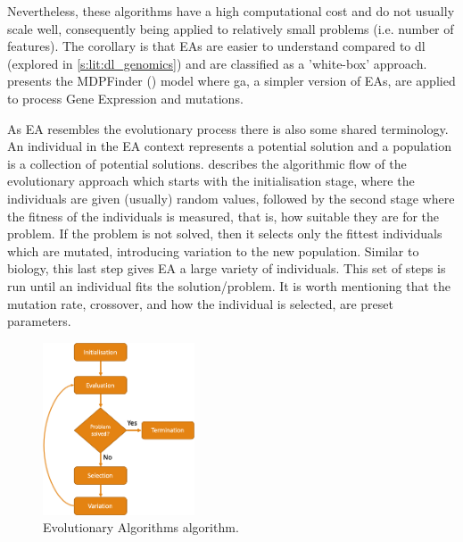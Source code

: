 Nevertheless, these algorithms have a high computational cost and do not usually scale well, consequently being applied to relatively small problems (i.e. number of features). The corollary is that EAs are easier to understand compared to  \acrfull{dl} (explored in \cref{s:lit:dl_genomics}) and are classified as a 'white-box' approach.  presents the MDPFinder (\citet{Zhao2012-wj}) model where \acrfull{ga}, a simpler version of EAs, are applied to process Gene Expression and mutations.


As EA resembles the evolutionary process there is also some shared terminology. An individual in the EA context represents a potential solution and a population is a collection of potential solutions.  describes the algorithmic flow of the evolutionary approach which starts with the initialisation stage, where the individuals are given (usually) random values, followed by the second stage where the fitness of the individuals is measured, that is, how suitable they are for the problem. If the problem is not solved, then it selects only the fittest individuals which are mutated, introducing variation to the new population. Similar to biology, this last step gives EA a large variety of individuals. This set of steps is run until an individual fits the solution/problem. It is worth mentioning that the mutation rate, crossover, and how the individual is selected, are preset parameters. 

\begin{figure}[!htb]
  \centering\includegraphics[width=0.4\textwidth,height=0.4\textheight,keepaspectratio]{Sections/Lit_review/Resources/EA_basic.png}
    \caption{Evolutionary Algorithms algorithm.}
    \label{fig:ea_basic}
\end{figure}
\FloatBarrier


